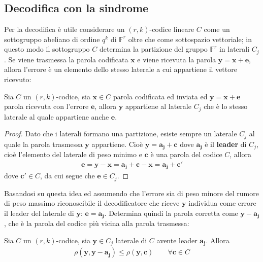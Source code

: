 \subsection{Decodifica con la sindrome}

Per la decodifica è utile considerare un $(r,k)$-codice lineare $C$ come un sottogruppo abeliano di ordine $q^k$ di $\mathbb{F}^{r}$ oltre che come sottospazio vettoriale; in questo modo il sottogruppo $C$ determina la partizione del gruppo $\mathbb{F}^{r}$ in laterali $C_{j}$. Se viene trasmessa la parola codificata $\mathbf{x}$ e viene ricevuta la parola $\mathbf{y} = \mathbf{x} + \mathbf{e}$, allora l'errore è un elemento dello stesso laterale a cui appartiene il vettore ricevuto:

\begin{teorema}
   Sia $C$ un $(r,k)$-codice, sia $\mathbf{x} \in C$ parola codificata ed inviata ed $\mathbf{y} = \mathbf{x} + \mathbf{e}$ parola ricevuta con l'errore $\mathbf{e}$, allora $\mathbf{y}$ appartiene al laterale $C_{j}$ che è lo stesso laterale al quale appartiene anche $\mathbf{e}$.
\end{teorema}
\begin{proof}
   Dato che i laterali formano una partizione, esiste sempre un laterale $C_{j}$ al quale la parola trasmessa $\mathbf{y}$ appartiene. Cioè $\mathbf{y} = \mathbf{a_{j}} + \mathbf{c}$ dove $\mathbf{a_{j}}$ è il {\bf leader} di $C_{j}$, cioè l'elemento del laterale di peso minimo e $\mathbf{c}$ è una parola del codice $C$, allora
   \begin{align*}
      \mathbf{e} = \mathbf{y} - \mathbf{x} = \mathbf{a_{j}} + \mathbf{c} - \mathbf{x} = \mathbf{a_{j}} + \mathbf{c'}
   \end{align*}
   dove $\mathbf{c'} \in C$, da cui segue che $\mathbf{e} \in C_{j}$.
\end{proof}
\noindent
Basandosi su questa idea ed assumendo che l'errore sia di peso minore del rumore di peso massimo riconoscibile il decodificatore che riceve $\mathbf{y}$ individua come errore il leader del laterale di $\mathbf{y}$: $\mathbf{e} = \mathbf{a_{j}}$. Determina quindi la parola corretta come $\mathbf{y} - \mathbf{a_{j}}$, che è la parola del codice più vicina alla parola trasmessa:
\begin{teorema}
   Sia $C$ un $(r,k)$-codice, sia $\mathbf{y} \in C_{j}$ laterale di $C$ avente leader $\mathbf{a_{j}}$. Allora 
   \begin{align*}
      \rho (\mathbf{y} ,\mathbf{y} -\mathbf{a_{j}} ) \leq \rho (\mathbf{y} ,\mathbf{c}) \qquad \forall \mathbf{c} \in C
   \end{align*}
\end{teorema}
